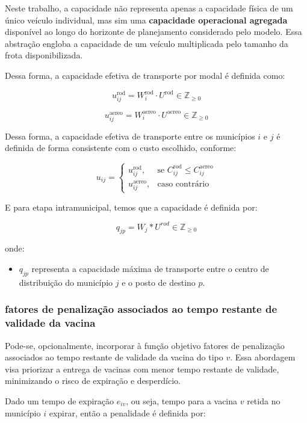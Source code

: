 Neste trabalho, a capacidade não representa apenas a capacidade física de um único veículo individual, mas sim uma \textbf{capacidade operacional agregada} disponível ao longo do horizonte de planejamento considerado pelo modelo. Essa abstração engloba a capacidade de um veículo multiplicada pelo tamanho da frota disponibilizada.

Dessa forma, a capacidade efetiva de transporte por modal é definida como:

\[
u_{ij}^{\text{rod}} = W_i^{\text{rod}} \cdot U^{\text{rod}} \in \mathbb{Z}_{\ge 0}
\]

\[
u_{ij}^{\text{aereo}} = W_i^{\text{aereo}} \cdot U^{\text{aereo}}  \in \mathbb{Z}_{\ge 0}
\]

Dessa forma, a capacidade efetiva de transporte entre os municípios $i$ e $j$ é definida de forma consistente com o custo escolhido, conforme:

\begin{equation}
u_{ij} =
\begin{cases}
u_{ij}^{\text{rod}}, & \text{se } C_{ij}^{\text{rod}} \le C_{ij}^{\text{aereo}} \\
u_{ij}^{\text{aereo}}, & \text{caso contrário}
\end{cases}
\end{equation}

E para etapa intramunicipal, temos que a capacidade é definida por:

\[
q_{jp} = W_{j} * U^{rod} \in \mathbb{Z}_{\ge 0}
\]

onde:
\begin{itemize}
    \item $q_{jp}$ representa a capacidade máxima de transporte entre o centro de distribuição do município $j$ e o posto de destino $p$.
\end{itemize}



\subsubsection{fatores de penalização associados ao tempo restante de validade da vacina}

Pode-se, opcionalmente, incorporar à função objetivo fatores de penalização associados ao tempo restante de validade da vacina do tipo $v$. Essa abordagem visa priorizar a entrega de vacinas com menor tempo restante de validade, minimizando o risco de expiração e desperdício.

Dado um tempo de expiração $e_{iv}$, ou seja, tempo para a vacina $v$ retida no município $i$ expirar, então a penalidade é definida por: 

